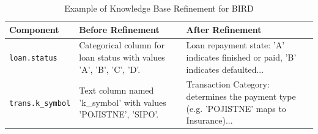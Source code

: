 \documentclass[runningheads]{llncs}
\begin{document}
\begin{table}[ht]
\centering
\footnotesize %
\begin{tabular}{lp{4.5cm}p{6cm}}
\toprule
\textbf{Component} & \textbf{Before Refinement} & \textbf{After Refinement} \\
\midrule
\texttt{loan.status}    &  Categorical column for loan status with values 'A', 'B', 'C', 'D'.  & Loan repayment state: 'A' indicates finished or paid, 'B' indicates defaulted...  \\
\texttt{trans.k\_symbol} & Text column named 'k\_symbol' with values 'POJISTNE', 'SIPO'. & Transaction Category: determines the payment type (e.g. 'POJISTNE' maps to Insurance)... \\
\bottomrule
\end{tabular}
\caption{Example of Knowledge Base Refinement for BIRD\cite{li2023bird}}\label{tab:kb-refinement-example}
\end{table}
\end{document}
